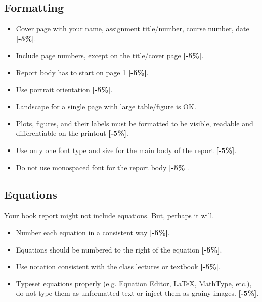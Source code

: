 \documentclass{article}
\begin{document}
\subsection{Formatting}
\begin{itemize}
        \item Cover page with your name, assignment title/number, course number, date {\color{red}\textbf{[-5\%]}}.
        \item     Include page numbers, except on the title/cover page  {\color{red}\textbf{[-5\%]}}.
        \item Report body has to start on page 1  {\color{red}\textbf{[-5\%]}}.
        \item    Use portrait orientation  {\color{red}\textbf{[-5\%]}}.
        \item    Landscape for a single page with large table/figure is OK.
        \item Plots, figures, and their labels must be formatted to be visible, 
                readable and differentiable on the printout  {\color{red}\textbf{[-5\%]}}.
        \item    Use only one font type and size for the main body of the report  {\color{red}\textbf{[-5\%]}}.
        \item    Do not use monospaced font for the report body  {\color{red}\textbf{[-5\%]}}.
\end{itemize}

\subsection{Equations}
Your book report might not include equations. But, perhaps it will.
\begin{itemize}
        \item Number each equation in a consistent way  {\color{red}\textbf{[-5\%]}}.
        \item    Equations should be numbered to the right of the equation  {\color{red}\textbf{[-5\%]}}.
        \item    Use notation consistent with the class lectures or textbook  {\color{red}\textbf{[-5\%]}}.
        \item    Typeset equations properly (e.g. Equation Editor, LaTeX, MathType, etc.), 
do not type them as unformatted text or inject them as grainy images.  {\color{red}\textbf{[-5\%]}}.
\end{itemize}
\end{document}

